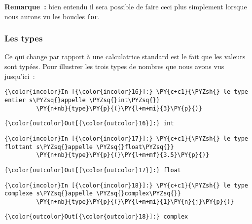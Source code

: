     \textbf{Remarque~:} bien entendu il sera possible de faire ceci plus
simplement lorsque nous aurons vu les boucles \texttt{for}.

    \hypertarget{les-types}{%
\subsubsection{Les types}\label{les-types}}

    Ce qui change par rapport à une calculatrice standard est le fait que
les valeurs sont typées. Pour illustrer les trois types de nombres que
nous avons vus jusqu'ici~:

    \begin{Verbatim}[commandchars=\\\{\}]
{\color{incolor}In [{\color{incolor}16}]:} \PY{c+c1}{\PYZsh{} le type entier s\PYZsq{}appelle \PYZsq{}int\PYZsq{}}
         \PY{n+nb}{type}\PY{p}{(}\PY{l+m+mi}{3}\PY{p}{)}
\end{Verbatim}


\begin{Verbatim}[commandchars=\\\{\}]
{\color{outcolor}Out[{\color{outcolor}16}]:} int
\end{Verbatim}
            
    \begin{Verbatim}[commandchars=\\\{\}]
{\color{incolor}In [{\color{incolor}17}]:} \PY{c+c1}{\PYZsh{} le type flottant s\PYZsq{}appelle \PYZsq{}float\PYZsq{}}
         \PY{n+nb}{type}\PY{p}{(}\PY{l+m+mf}{3.5}\PY{p}{)}
\end{Verbatim}


\begin{Verbatim}[commandchars=\\\{\}]
{\color{outcolor}Out[{\color{outcolor}17}]:} float
\end{Verbatim}
            
    \begin{Verbatim}[commandchars=\\\{\}]
{\color{incolor}In [{\color{incolor}18}]:} \PY{c+c1}{\PYZsh{} le type complexe s\PYZsq{}appelle \PYZsq{}complex\PYZsq{}}
         \PY{n+nb}{type}\PY{p}{(}\PY{l+m+mi}{1}\PY{n}{j}\PY{p}{)}
\end{Verbatim}


\begin{Verbatim}[commandchars=\\\{\}]
{\color{outcolor}Out[{\color{outcolor}18}]:} complex
\end{Verbatim}
            
